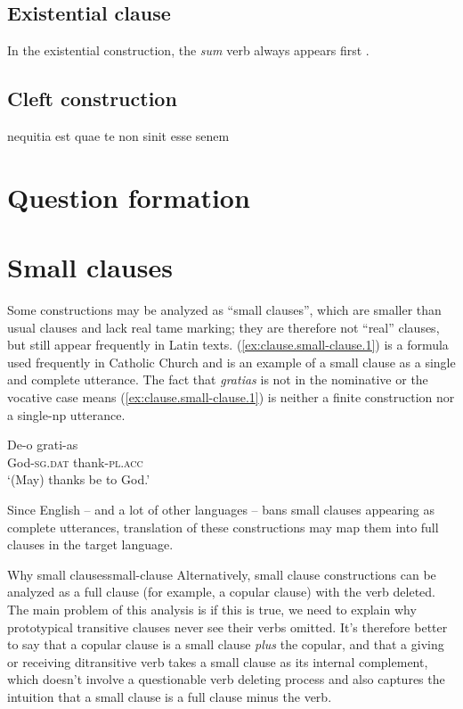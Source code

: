 \documentclass[a4paper, oneside, 12pt]{report}
\newcommand*{\citepage}[1]{p.~{#1}}
\newcommand{\form}[1]{\emph{#1}}
\newcommand*{\category}[1]{\textsc{#1}}
\newcommand{\translate}[1]{`#1'}
\begin{document}
\subsection{Existential clause}\label{sec:clause.exist}

In the existential construction,
the \form{sum} verb always appears first
\citep[\citepage{396}]{allen1903allen}.

\subsection{Cleft construction}

nequitia est quae te non sinit esse senem

\section{Question formation}

\section{Small clauses}

Some constructions may be analyzed as ``small clauses'', 
which are smaller than usual clauses 
and lack real \acs{tame} marking;
they are therefore not ``real'' clauses, 
but still appear frequently in Latin texts.
(\ref{ex:clause.small-clause.1}) is a formula used frequently in Catholic Church 
and is an example of a small clause 
as a single and complete utterance.
The fact that \form{gratias} is not in the nominative or the vocative case 
means (\ref{ex:clause.small-clause.1}) is 
neither a finite construction nor a single-\acs{np} utterance.


\begin{exe}
    \ex \gll De-o grati-as \\
    God-\category{sg}.\category{dat} thank-\category{pl}.\category{acc} \\
    \glt \translate{(May) thanks be to God.}
    \label{ex:clause.small-clause.1}
\end{exe}

Since English -- and a lot of other languages -- 
bans small clauses appearing as complete utterances,
translation of these constructions may map them into full clauses in the target language. 

\begin{infobox}{Why small clauses}{small-clause}
    Alternatively, small clause constructions can be analyzed 
    as a full clause (for example, a copular clause) with the verb deleted.
    The main problem of this analysis is if this is true, 
    we need to explain why prototypical transitive clauses 
    never see their verbs omitted.
    It's therefore better to say 
    that a copular clause is a small clause \emph{plus} the copular,
    and that a giving or receiving ditransitive verb 
    takes a small clause as its internal complement,
    which doesn't involve a questionable verb deleting process
    and also captures the intuition that 
    a small clause is a full clause minus the verb.
\end{infobox}
\end{document}
